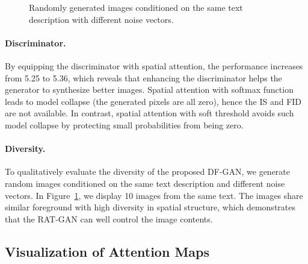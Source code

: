 \documentclass{article}
\begin{document}
\begin{figure}[b]
	\caption{Randomly generated images conditioned on the same text description with different noise vectors.}
	\label{Fig:variaty}
\end{figure}
	
	\paragraph{Discriminator.}By equipping the discriminator with spatial attention, the performance increases from 5.25 to 5.36, which reveals that enhancing the discriminator helps the generator to synthesize better images. Spatial attention with softmax function leads to model collapse (the generated pixels are all zero), hence the IS and FID are not available. In contrast, spatial attention with soft threshold avoids such model collapse by protecting small probabilities from being zero.
	
	

	
	
	\paragraph{Diversity.} To qualitatively evaluate the diversity of the proposed DF-GAN, we generate random images conditioned on the same text description and different noise vectors. In Figure~\ref{Fig:variaty}, we display 10 images from the same text. The images share similar foreground with high diversity in spatial structure, which demonstrates that the RAT-GAN can well control the image contents.
	
	\subsection{Visualization of Attention Maps}
\end{document}
